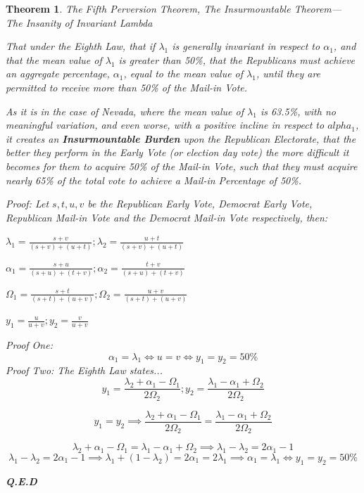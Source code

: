 \documentclass[preprint,13pt]{elsarticle}
\newtheorem{theorem}{Theorem}[section]
\begin{document}
\begin{theorem}{The Fifth Perversion Theorem, The Insurmountable Theorem--- The Insanity of Invariant Lambda}

That under the Eighth Law, that if $\lambda_{1}$ is generally invariant in respect to $\alpha_{1}$, and that the mean value of $\lambda_{1}$ is greater than 50\%, that the Republicans must achieve an aggregate percentage, $\alpha_{1}$, equal to the mean value of $\lambda_{1}$, until they are permitted to receive more than 50\% of the Mail-in Vote.

As it is in the case of Nevada, where the mean value of $\lambda_{1}$ is 63.5\%, with no meaningful variation, and even worse, with a positive incline in respect to $alpha_{1}$, it creates an \textbf{Insurmountable Burden} upon the Republican Electorate, that the better they perform in the Early Vote (or election day vote) the more difficult it becomes for them to acquire 50\% of the Mail-in Vote, such that they must acquire nearly 65\% of the total vote to achieve a Mail-in Percentage of 50\%.

Proof:
Let $s,t,u,v$ be the Republican Early Vote, Democrat Early Vote, Republican Mail-in Vote and the Democrat Mail-in Vote respectively, then:

$\lambda_{1}=\frac{s+v}{(s+v)+(u+t)}; \lambda_{2}=\frac{u+t}{(s+v)+(u+t)}$

$\alpha_{1}=\frac{s+u}{(s+u)+(t+v)}; \alpha_{2}=\frac{t+v}{(s+u)+(t+v)}$

$\Omega_{1}=\frac{s+t}{(s+t)+(u+v)}; \Omega_{2}=\frac{u+v}{(s+t)+(u+v)}$

$y_{1}=\frac{u}{u+v}; y_{2}=\frac{v}{u+v}$

Proof One:
$$\alpha_{1}=\lambda_{1} \iff u=v \iff y_{1}=y_{2}=50\%$$
Proof Two: The Eighth Law states...
$$y_{1}=\frac{\lambda_{2}+\alpha_{1}-\Omega_{1}}{2\Omega_{2}}; y_{2}=\frac{\lambda_{1}-\alpha_{1}+\Omega_{2}}{2\Omega_{2}}$$

$$y_{1}=y_{2} \implies \frac{\lambda_{2}+\alpha_{1}-\Omega_{1}}{2\Omega_{2}}=\frac{\lambda_{1}-\alpha_{1}+\Omega_{2}}{2\Omega_{2}}$$

$$\lambda_{2}+\alpha_{1}-\Omega_{1}=\lambda_{1}-\alpha_{1}+\Omega_{2} \implies \lambda_{1}-\lambda_{2}=2\alpha_{1}-1$$
$$\lambda_{1}-\lambda_{2}=2\alpha_{1}-1 \implies \lambda_{1}+(1-\lambda_{2})=2\alpha_{1}=2\lambda_{1} \implies \alpha_{1}=\lambda_{1} \iff y_{1}=y_{2}=50\%$$
\begin{flushright}
\textbf{Q.E.D}
\end{flushright}
\end{theorem}
\end{document}
